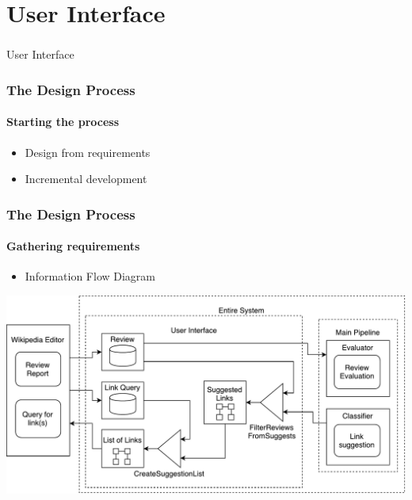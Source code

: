 \section[UI]{User Interface}

\begin{frame}
  \frametitle{}
  \begin{center}
    {\Huge User Interface}
  \end{center}
\end{frame}

\begin{frame}
    \frametitle{The Design Process}
    \framesubtitle{Starting the process}
    \begin{itemize}
    	\item Design from requirements
    	\item Incremental development
    \end{itemize}
\end{frame}

\begin{frame}
    \frametitle{The Design Process}
    \framesubtitle{Gathering requirements}
    \begin{itemize}
    	\item Information Flow Diagram
    \end{itemize}
    \includegraphics[width=\textwidth]{wikiAPI.pdf}
\end{frame}





